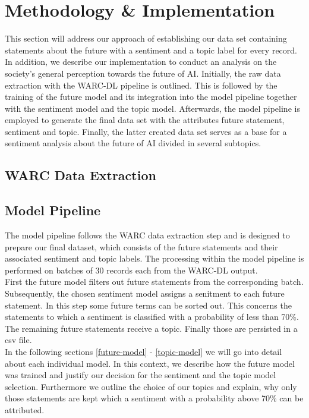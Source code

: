 \documentclass[11pt]{article}
\begin{document}
\section{Methodology \& Implementation}
This section will address our approach of establishing our data set containing statements about the future with a sentiment and a topic label for every record. In addition, we describe our implementation to conduct an analysis on the society's general perception towards the future of AI. Initially, the raw data extraction with the WARC-DL pipeline \citep{Deckers2022} is outlined. This is followed by the training of the future model and its integration into the model pipeline together with the sentiment model and the topic model. Afterwards, the model pipeline is employed to generate the final data set with the attributes future statement, sentiment and topic.
Finally, the latter created data set serves as a base for a sentiment analysis about the future of AI divided in several subtopics.

\subsection{WARC Data Extraction}

\subsection {Model Pipeline}
The model pipeline follows the WARC data extraction step and is designed to prepare our final dataset, which consists of the future statements and their associated sentiment and topic labels.
The processing within the model pipeline is performed on batches of 30 records each from the WARC-DL output.\\
First the future model filters out future statements from the corresponding batch.
Subsequently, the chosen sentiment model assigns a senitment to each future statement.
In this step some future terms can be sorted out. This concerns the statements to which a sentiment is classified with a probability of less than 70\%.
The remaining future statements receive a topic.
Finally those are  persisted in a csv file.\\
In the following sections \ref{future-model} - \ref{topic-model} we will go into detail about each individual model. 
In this context, we describe how the future model was trained and justify our decision for the sentiment and the topic model selection.
Furthermore we outline the choice of our topics and explain, why only those statements are kept which a sentiment with a probability above 70\% can be attributed.
\end{document}
